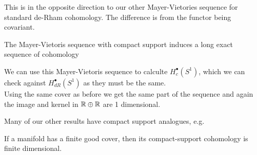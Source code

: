 \documentclass{article}
\begin{document}
\begin{remark}
	This is in the opposite direction to our other Mayer-Vietories sequence for standard de-Rham cohomology. The difference is from the functor being covariant. 
\end{remark}

\begin{prop}
	The Mayer-Vietoris sequence with compact support induces a long exact sequence of cohomology
	\begin{center}
	\end{center}
\end{prop}

\begin{example}
	We can use this Mayer-Vietoris sequence to calculte $H_c^\bullet(S^1)$, which we can check against $H^\bullet_{dR}(S^1)$ as they must be the same. \\
	Using the same cover as before we get the same part of the sequence 
	and again the image and kernel in $\mathbb{R} \oplus \mathbb{R}$ are 1 dimensional. 
\end{example}

Many of our other results have compact support analogues, e.g. 
\begin{prop}
	If a manifold has a finite good cover, then its compact-support cohomology is finite dimensional. 
\end{prop}
\end{document}
